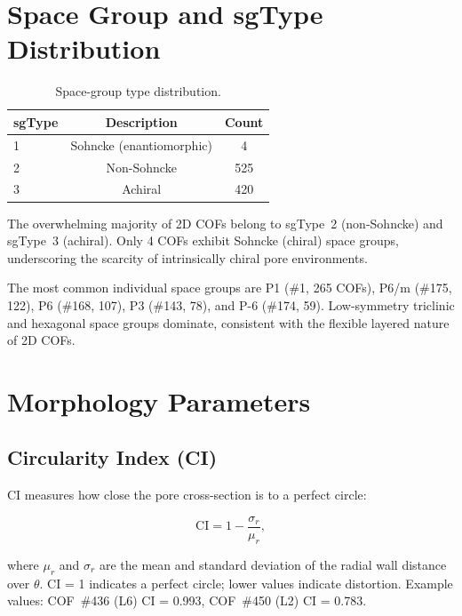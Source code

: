 \documentclass[11pt,a4paper]{article}
\begin{document}
\section{Space Group and sgType Distribution}

\begin{table}[h]
\centering
\begin{tabular}{lcc}
\toprule
sgType & Description & Count \\
\midrule
1 & Sohncke (enantiomorphic) & 4 \\
2 & Non-Sohncke & 525 \\
3 & Achiral & 420 \\
\bottomrule
\end{tabular}
\caption{Space-group type distribution.}
\end{table}

The overwhelming majority of 2D COFs belong to sgType~2 (non-Sohncke) and
sgType~3 (achiral).  Only 4 COFs exhibit Sohncke (chiral) space groups,
underscoring the scarcity of intrinsically chiral pore environments.

The most common individual space groups are P1 (\#1, 265 COFs),
P6/m (\#175, 122), P6 (\#168, 107), P3 (\#143, 78), and P-6 (\#174, 59).
Low-symmetry triclinic and hexagonal space groups dominate, consistent
with the flexible layered nature of 2D COFs.

\section{Morphology Parameters}

\subsection{Circularity Index (CI)}

CI measures how close the pore cross-section is to a perfect circle:

\[
\text{CI} = 1 - \frac{\sigma_r}{\mu_r},
\]

where $\mu_r$ and $\sigma_r$ are the mean and standard deviation of the
radial wall distance over $\theta$.  CI = 1 indicates a perfect circle;
lower values indicate distortion.  Example values: COF~\#436 (L6)
CI = 0.993, COF~\#450 (L2) CI = 0.783.
\end{document}
